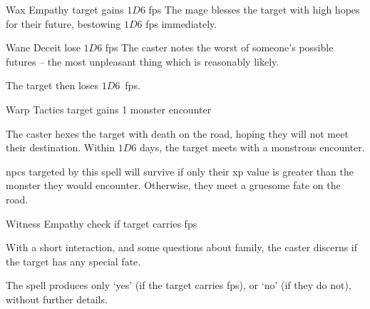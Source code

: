   {\mFate}%
  {Wax}%
  {}%
  {Empathy}%
  {target gains $1D6$ \glspl{fp}}%
  {
    The mage blesses the target with high hopes for their future, bestowing $1D6$ \glspl{fp} immediately.
  }

  {\mFate}%
  {Wane}%
  {}%
  {Deceit}%
  {lose $1D6$ \glspl{fp}}%
  {
  The caster notes the worst of someone's possible futures -- the most unpleasant thing which is reasonably likely.
  }

The target then loses $1D6$~\glspl{fp}.

  {\mFate}%
  {Warp}%
  {}%
  {Tactics}%
  {target gains 1 monster encounter}%
  {
    The caster hexes the target with death on the road, hoping they will not meet their destination.
    Within $1D6$ days, the target meets with a monstrous encounter.%

    \Glspl{npc} targeted by this spell will survive if only their \gls{xp} value is greater than the monster they would encounter.
    Otherwise, they meet a gruesome fate on the road.
  }

  {\mFate}%
  {Witness}%
  {}%
  {Empathy}%
  {check if target carries \glspl{fp}}%
  {
    With a short interaction, and some questions about family, the caster discerns if the target has any special fate.

    The spell produces only `yes' (if the target carries \glspl{fp}), or `no' (if they do not), without further details.
  }

